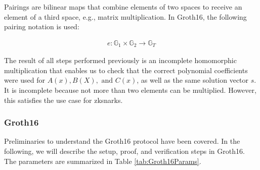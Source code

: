 Pairings are bilinear maps that combine elements of two spaces to receive an element of a third space, e.g., matrix multiplication. In Groth16, the following pairing notation is used:

\begin{align}
    e: \mathbb{G}_1 \times \mathbb{G}_2 \to \mathbb{G}_T
\end{align}

The result of all steps performed previously is an incomplete homomorphic multiplication that enables us to check that the correct polynomial coefficients were used for \(A(x), B(X), \text{ and }C(x)\), as well as the same solution vector \(s\). It is incomplete because not more than two elements can be multiplied. However, this satisfies the use case for \acrshort{zksnark}s. 

\subsubsection{Groth16}

Preliminaries to understand the Groth16 protocol have been covered. In the following, we will describe the setup, proof, and verification steps in Groth16. The parameters are summarized in Table \ref{tab:Groth16Params}.

